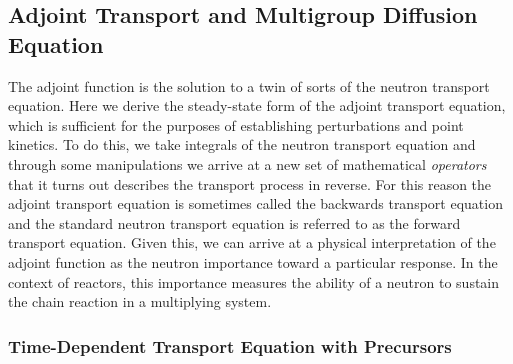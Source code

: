 \subsection{Adjoint Transport and Multigroup Diffusion Equation}

The adjoint function is the solution to a twin of sorts of the neutron transport equation. Here we derive the steady-state form of the adjoint transport equation, which is sufficient for the purposes of establishing perturbations and point kinetics. To do this, we take integrals of the neutron transport equation and through some manipulations we arrive at a new set of mathematical \emph{operators} that it turns out describes the transport process in reverse. For this reason the adjoint transport equation is sometimes called the backwards transport equation and the standard neutron transport equation is referred to as the forward transport equation. Given this, we can arrive at a physical interpretation of the adjoint function as the neutron importance toward a particular response. In the context of reactors, this importance measures the ability of a neutron to sustain the chain reaction in a multiplying system.

\subsubsection{Time-Dependent Transport Equation with Precursors}


